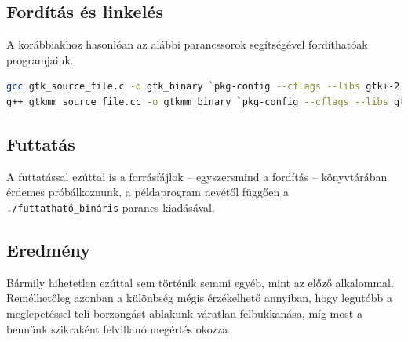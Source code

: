 \subsection{Fordítás és linkelés}

A korábbiakhoz hasonlóan az alábbi parancssorok segítségével fordíthatóak programjaink.

\begin{lstlisting}[language=bash, numbers=none, basicstyle=\ttfamily, keywordsprefix=window, keywordstyle=\itshape, basewidth={0.5em, 0.4em}]
gcc gtk_source_file.c -o gtk_binary `pkg-config --cflags --libs gtk+-2.0`
g++ gtkmm_source_file.cc -o gtkmm_binary `pkg-config --cflags --libs gtkmm-2.4`
\end{lstlisting}

\subsection{Futtatás}

A futtatással ezúttal is a forrásfájlok -- egyszersmind a fordítás -- könyvtárában érdemes próbálkoznunk, a példaprogram nevétől függően a \texttt{./futtatható\_bináris} parancs kiadásával.

\subsection{Eredmény}

Bármily hihetetlen ezúttal sem történik semmi egyéb, mint az előző alkalommal. Remélhetőleg azonban a különbség mégis érzékelhető annyiban, hogy legutóbb a meglepetéssel teli borzongást ablakunk váratlan felbukkanása, míg most a bennünk szikraként felvillanó megértés okozza.
 
